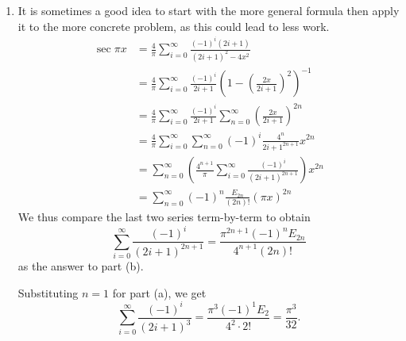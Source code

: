\begin{enumerate}[wide, labelindent = 0pt, label = (\alph*)]
	\item
	      It is sometimes a good idea to start with the more general formula then apply it to the more concrete problem,
	      as this could lead to less work.
	      \begin{align*}
		      \sec \pi x
		       & = \frac{4}{\pi} \sum_{i = 0}^\infty \frac{{(-1)}^i (2i + 1)}{{(2i + 1)}^2 - 4x^2}                     \\
		       & = \frac{4}{\pi} \sum_{i = 0}^\infty \frac{{(-1)}^i}{2i + 1} {\left(
			      1 - {\left( \frac{2x}{2i + 1} \right)}^2
		      \right)}^{-1}                                                                                            \\
		       & = \frac{4}{\pi} \sum_{i = 0}^\infty \frac{{(-1)}^i}{2i + 1} \sum_{n = 0}^\infty {\left(
			      \frac{2x}{2i + 1}
		      \right)}^{2n}                                                                                            \\
		       & = \frac{4}{\pi} \sum_{i = 0}^\infty \sum_{n = 0}^\infty {(-1)}^i \frac{4^n}{{2i + 1}^{2n + 1}} x^{2n} \\
		       & = \sum_{n = 0}^\infty \left(
		      \frac{4^{n + 1}}{\pi} \sum_{i = 0}^\infty \frac{{(-1)}^i}{{(2i + 1)}^{2n + 1}}
		      \right) x^{2n}                                                                                           \\
		       & = \sum_{n = 0}^\infty {(-1)}^n \frac{E_{2n}}{(2n)!} {(\pi x)}^{2n}
	      \end{align*}
	      We thus compare the last two series term-by-term to obtain
	      \[
		      \sum_{i = 0}^\infty \frac{{(-1)}^i}{{(2i + 1)}^{2n + 1}}
		      = \frac{\pi^{2n + 1} {(-1)}^n E_{2n}}{4^{n + 1} (2n)!}
	      \]
	      as the answer to part (b).

	      Substituting $n = 1$ for part (a), we get
	      \[
		      \sum_{i = 0}^\infty \frac{{(-1)}^i}{{(2i + 1)}^3}
		      = \frac{\pi^3 {(-1)}^1 E_{2}}{4^2 \cdot 2!}
		      = \frac{\pi^3}{32}.
	      \]
\end{enumerate}